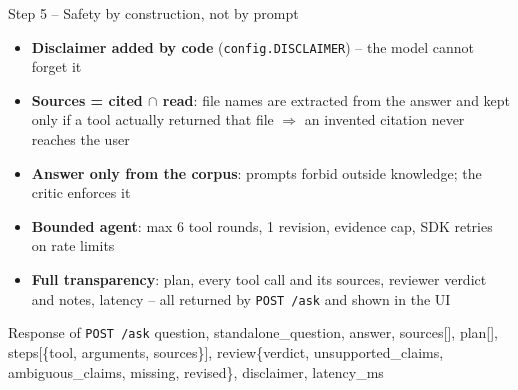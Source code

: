 \documentclass[aspectratio=169,11pt]{beamer}
\newcommand{\file}[1]{\texttt{\small #1}}
\begin{document}
\begin{frame}{Step 5 -- Safety by construction, not by prompt}
  \begin{itemize}
    \item \textbf{Disclaimer added by code} (\file{config.DISCLAIMER}) -- the model cannot forget it
    \item \textbf{Sources = cited $\cap$ read}: file names are extracted from the answer and kept
          only if a tool actually returned that file $\Rightarrow$ an invented citation never reaches the user
    \item \textbf{Answer only from the corpus}: prompts forbid outside knowledge; the critic enforces it
    \item \textbf{Bounded agent}: max 6 tool rounds, 1 revision, evidence cap, SDK retries on rate limits
    \item \textbf{Full transparency}: plan, every tool call and its sources, reviewer verdict and notes,
          latency -- all returned by \texttt{POST /ask} and shown in the UI
  \end{itemize}
  \vspace{0.5em}
  \begin{block}{Response of \texttt{POST /ask}}
    \small\ttfamily
    question, standalone\_question, answer, sources[], plan[], steps[\{tool, arguments, sources\}],
    review\{verdict, unsupported\_claims, ambiguous\_claims, missing, revised\}, disclaimer, latency\_ms
  \end{block}
\end{frame}
\end{document}
